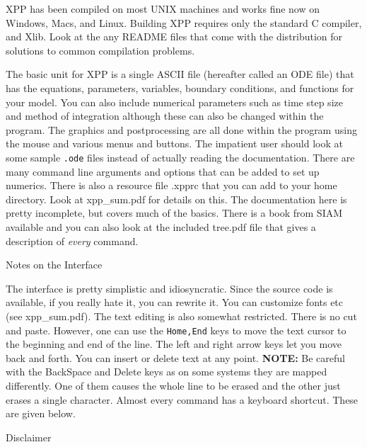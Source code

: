 \documentclass{article}
\newcommand{\tc}[1]{\addcontentsline{toc}{subsection}{#1}}
\begin{document}
XPP has been compiled on most UNIX machines and works fine now on Windows, Macs, and Linux.
Building XPP requires only the standard C compiler,
 and Xlib.  Look at the any README files that come with the
distribution for solutions to common compilation problems.



The basic unit for XPP is a single ASCII file (hereafter called an ODE
file) that has the equations, parameters,
 variables, boundary conditions, and functions for your model. You can
also include numerical parameters such as time step size and method of
integration although these can also be changed within the program.
The graphics and postprocessing are all done within
 the program using the mouse and various menus and buttons.  The impatient
 user should look at some sample {\tt *.ode} files instead of actually reading 
the documentation.  There are many command line arguments and options that can be added to set up numerics. There is also a resource file .xpprc that you can add to your home directory.  Look at xpp\_sum.pdf for details on this.  The documentation here is pretty incomplete, but covers much of the basics. There is a book from SIAM available and you can also look at the included tree.pdf file that gives a description of {\em every} command.

 
\begin{center}
{\Large Notes on the Interface }
\end{center}
The interface is pretty simplistic and idiosyncratic.  Since the source code is available, if you really hate it, you can rewrite it.  You can customize fonts etc (see xpp\_sum.pdf).  
The text editing is also somewhat restricted.  There is  no cut
and paste.  However,
one can use the {\tt Home,End} keys to move the text cursor to the
beginning and end of the line.  The left and right arrow keys let you
move back and forth.  You can  insert or delete text at any point.
{\bf NOTE:} Be careful with the BackSpace and Delete keys as on some
systems they are mapped differently.  One of them causes the whole
line to be erased and the other just erases a single character.
Almost every command has a keyboard shortcut.  These are given below.


\tc{Disclaimer}
\begin{center} 

\Large Disclaimer \\

\end{center}
\end{document}
